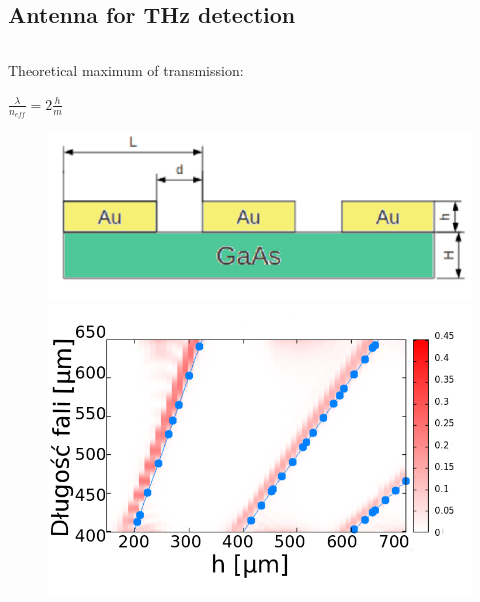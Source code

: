 \documentclass{beamer}
\begin{document}
\subsection{Antenna for THz detection}
\begin{frame}
	\begin{columns}
		\begin{column}{0.5\textwidth}
			{\tiny Theoretical maximum of transmission:}\\
			\centerline{$\frac{\lambda}{n_{eff}}=2\frac{h}{m}$}
			\begin{figure}
				\includegraphics[width=.9\textwidth]{../images/antenaThz/schemat.png}\\
				\includegraphics[width=.9\textwidth]{../images/antenaThz/rezonant_trans_f001.png}\\
			\end{figure}
		

\end{column}
\end{columns}
\end{frame}
\end{document}
